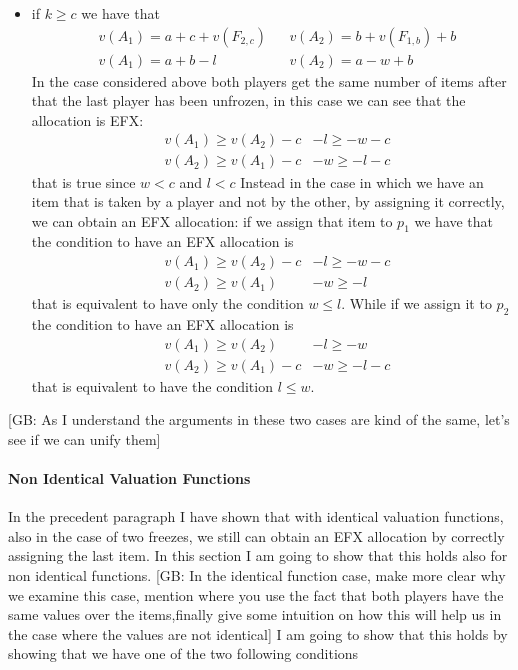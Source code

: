 \documentclass{article}
\newcommand{\gb}[1]{{\color{red}[GB: #1]}}
\begin{document}
\begin{itemize}
    \item if $k \ge c$ we have that
    \begin{align*}
        &v(A_1) = a + c + v(F_{2,c}) && v(A_2) = b + v(F_{1,b}) + b\\
        &v(A_1) = a + b-l && v(A_2) = a - w + b
    \end{align*}
    In the case considered above both players get the same number of items after that the last player has been unfrozen, in this case we can see that the allocation is EFX: 
    \begin{align*}
        &v(A_1) \ge v(A_2) -c & -l \ge - w - c\\
        &v(A_2) \ge v(A_1) -c & -w \ge -l -c
    \end{align*}
    that is true since $w<c$ and $l<c$
    Instead in the case in which we have an item that is taken by a player and not by the other, by assigning it correctly, we can obtain an EFX allocation: if we assign that item to $p_1$ we have that the condition to have an EFX allocation is
    \begin{align*}
        &v(A_1) \ge v(A_2) -c & -l \ge - w - c\\
        &v(A_2) \ge v(A_1) & -w \ge -l 
    \end{align*}
    that is equivalent to have only the condition $w\le l$.
    While if we assign it to $p_2$ the condition to have an EFX allocation is
    \begin{align*}
        &v(A_1) \ge v(A_2) & -l \ge - w\\
        &v(A_2) \ge v(A_1)-c & -w \ge -l -c
    \end{align*}
    that is equivalent to have the condition $l\le w$.
\end{itemize}
\gb{As I understand the arguments in these two cases are kind of the same, let's see if we can unify them}
\paragraph{Non Identical Valuation Functions} 
In the precedent paragraph I have shown that with identical valuation functions, also in the case of two freezes, we still can obtain an EFX allocation by correctly assigning the last item. In this section I am going to show that this holds also for non identical functions.
\gb{In the identical function case, make more clear why we examine this case, mention where you use the fact that both players have the same values over the items,finally give some intuition on how this will help us in the case where the values are not identical}
I am going to show that this holds by showing that we have one of the two following conditions
\end{document}
